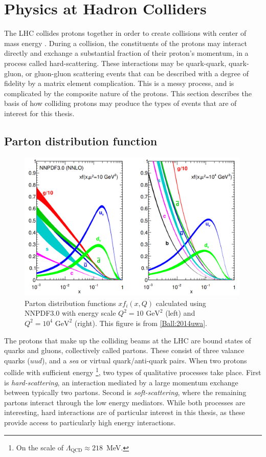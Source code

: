 \section{Physics at Hadron Colliders}

The LHC collides protons together in order to create collisions with center of mass energy \sqrts.
During a collision, the constituents of the protons may interact directly and exchange a substantial fraction of their proton's momentum, in a process called hard-scattering.
These interactions may be quark-quark, quark-gluon, or gluon-gluon scattering events that can be described with a degree of fidelity by a matrix element complication.
This is a messy process, and is complicated by the composite nature of the protons.
This section describes the basis of how colliding protons may produce the types of events that are of interest for this thesis.

\subsection{Parton distribution function}

\begin{figure}[h!]
\captionsetup[subfigure]{position=b}
\centering
\includegraphics[width=0.99\textwidth]{figures/pheno/pdgpdf.png}
\caption{Parton distribution functions $xf_i(x,Q)$ calculated using NNPDF3.0 with energy scale $Q^2=10\text{~GeV}^2$ (left) and $Q^2=10^4\text{~GeV}^2$ (right). This figure is from \ref{Ball:2014uwa}.}
\label{fig:partDistFunc}
\end{figure}

The protons that make up the colliding beams at the LHC are bound states of quarks and gluons, collectively called partons.
These consist of three valance quarks ($uud$), and a \emph{sea} or virtual quark/anti-quark pairs.
When two protons collide with sufficient energy \footnote{On the scale of $\Lambda_\text{QCD}\approx218$~MeV.}, two types of qualitative processes take place.
First is \emph{hard-scattering}, an interaction mediated by a large momentum exchange between typically two partons.
Second is \emph{soft-scattering}, where the remaining partons interact through the low energy mediators.
While both processes are interesting, hard interactions are of particular interest in this thesis, as these provide access to particularly high energy interactions.

